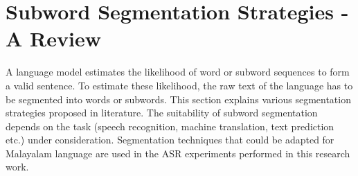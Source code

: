 












\section{Subword Segmentation Strategies -  A Review}
\label{segmentation-literature}

A language model estimates the likelihood of word or subword sequences to form
a valid sentence. To estimate these likelihood, the raw text of the language
has to be segmented into words or subwords. This section explains various
segmentation strategies proposed in literature. The suitability of subword
segmentation depends on the task (speech recognition, machine translation, text
prediction etc.) under consideration. Segmentation techniques that could be
adapted for Malayalam language are used in the ASR experiments performed in
this research work.


